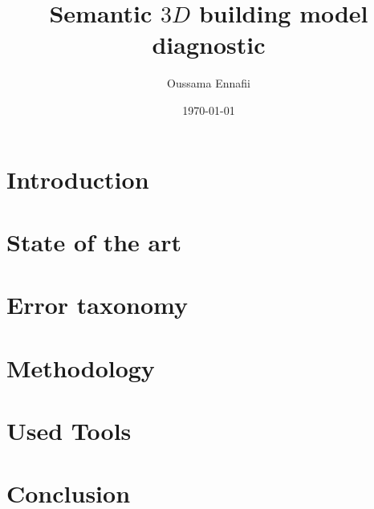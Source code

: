 \documentclass{beamer}
\title{Semantic $3D$ building model diagnostic}
\subtitle{}
\institute[LaSTIG MATIS]{Univ. Paris Est, LaSTIG MATIS, IGN, ENSG}
\date{\today}
\author[O.Ennafii]{Oussama Ennafii}
\begin{document}
    \begin{frame}[plain]
        \titlepage{}
    \end{frame}

    \section{Introduction}
    \section{State of the art}
    \section{Error taxonomy}
    \section{Methodology}
    \section{Used Tools}
    \section{Conclusion}
\end{document}
